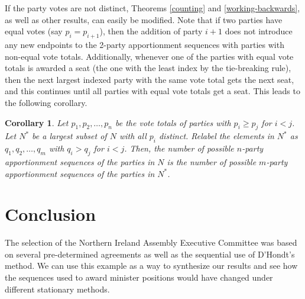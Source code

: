 \documentclass[pdflatex,sn-mathphys-num]{sn-jnl}
\theoremstyle{thmstyleone}%
\newtheorem{corollary}{Corollary}
\theoremstyle{thmstyletwo}%
\theoremstyle{thmstylethree}%
\begin{document}
If the party votes are not distinct, Theorems  \ref{counting}  and \ref{working-backwards}, as well as other results, can easily be modified. Note  that if two parties have equal votes (say   $p_i = p_{i+1}$), then the addition of party $i+1$ does not introduce any new endpoints to the 2-party apportionment sequences with parties with non-equal vote totals.  Additionally, whenever one of the parties with equal vote totals is awarded a seat (the one with the least index by the tie-breaking rule), then the next largest indexed party with the same vote total gets the next seat, and this continues until all parties with equal vote totals get a seat. This leads to the following corollary.

\begin{corollary} \label{last-cor} Let $p_1, p_2, \dots, p_n$ be the vote totals of parties with $p_i \ge p_j$ for $i < j$. Let $N^*$ be a largest subset of $N$ with all $p_i$ distinct.  Relabel the elements in $N^*$ as $q_1, q_2, \ldots, q_m$ with $q_i > q_j$ for $i < j$.  Then, the number of possible $n$-party apportionment sequences of the parties in $N$ is the number of possible $m$-party apportionment sequences of the parties in $N^*$. \end{corollary}





\section{Conclusion}\label{endremarks}

The selection of the Northern Ireland Assembly Executive Committee was based on several pre-determined agreements as well as the sequential use of D'Hondt's method. We can use this example as a way to synthesize our results and see how the sequences used to award minister positions would have changed under different stationary methods. 
\end{document}
